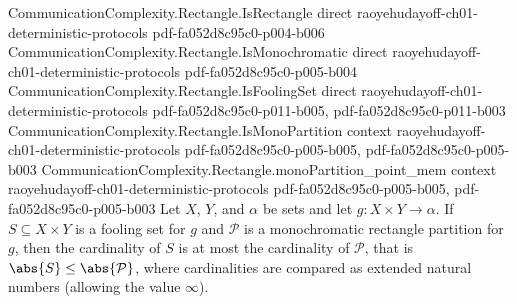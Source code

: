 \begin{theorem}
\label{CommunicationComplexity.Rectangle.foolingSet_encard_le_of_monoPartition}
\leanok
{}
\proofstep
  {CommunicationComplexity.Rectangle.IsRectangle}
  {direct}
  {raoyehudayoff-ch01-deterministic-protocols}
  {pdf-fa052d8c95c0-p004-b006}
\proofstep
  {CommunicationComplexity.Rectangle.IsMonochromatic}
  {direct}
  {raoyehudayoff-ch01-deterministic-protocols}
  {pdf-fa052d8c95c0-p005-b004}
\proofstep
  {CommunicationComplexity.Rectangle.IsFoolingSet}
  {direct}
  {raoyehudayoff-ch01-deterministic-protocols}
  {pdf-fa052d8c95c0-p011-b005,
    pdf-fa052d8c95c0-p011-b003}
\proofstep
  {CommunicationComplexity.Rectangle.IsMonoPartition}
  {context}
  {raoyehudayoff-ch01-deterministic-protocols}
  {pdf-fa052d8c95c0-p005-b005,
    pdf-fa052d8c95c0-p005-b003}
\proofstep
  {CommunicationComplexity.Rectangle.monoPartition_point_mem}
  {context}
  {raoyehudayoff-ch01-deterministic-protocols}
  {pdf-fa052d8c95c0-p005-b005,
    pdf-fa052d8c95c0-p005-b003}
Let $X$, $Y$, and $\alpha$ be sets and let $g : X \times Y \to \alpha$. If $S \subseteq
X \times Y$ is a fooling set for $g$ and $\mathcal{P}$ is a monochromatic rectangle
partition for $g$, then the cardinality of $S$ is at most the cardinality of
$\mathcal{P}$, that is $\abs{S} \le \abs{\mathcal{P}}$, where cardinalities are compared
as extended natural numbers (allowing the value $\infty$).
\end{theorem}

